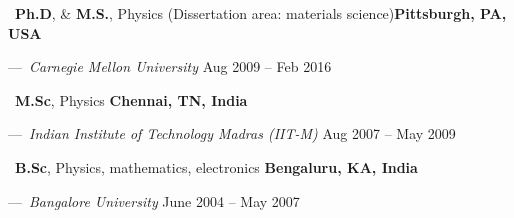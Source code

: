 ~\textbf{Ph.D}, \& \textbf{M.S.}, Physics (Dissertation area: materials science)\hfill \textbf{Pittsburgh, PA, USA} \par
\quad\quad---~\textit{Carnegie Mellon University}  \hfill Aug 2009 -- Feb 2016\par

~\textbf{M.Sc}, Physics \hfill \textbf{Chennai, TN, India} \par
\quad\quad---~\textit{Indian Institute of Technology Madras (IIT-M)}  \hfill Aug 2007 -- May 2009 \par

~\textbf{B.Sc}, Physics, mathematics, electronics \hfill \textbf{Bengaluru, KA, India} \par
\quad\quad---~\textit{Bangalore University}  \hfill June 2004 -- May 2007 \par
